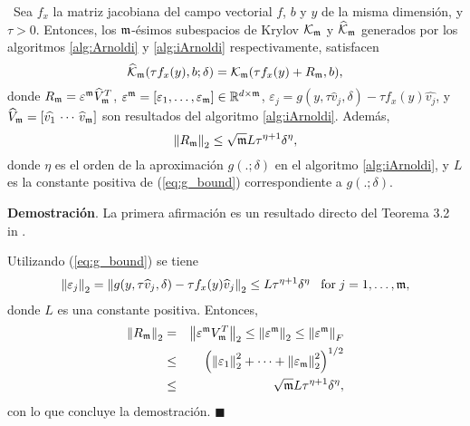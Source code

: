 \begin{theorem} \label{theorem:krilobapproxequality} \cite{naranjo2021locally}~Sea $f_x$ la matriz jacobiana del campo vectorial $f$, $b$ y $y$ de la misma dimensión, y $\tau>0$. Entonces, los $\mathfrak{m}$-ésimos subespacios de Krylov $\mathcal{K}_{\mathfrak{m}}$ y $\widehat{\mathcal{K}}_{\mathfrak{m}}$ generados por los algoritmos \ref{alg:Arnoldi} y \ref{alg:iArnoldi} respectivamente, satisfacen 
	\[ \widehat{\mathcal{K}}_{\mathfrak{m}}(\tau f_x(y),b;\delta) = \mathcal{K}_{\mathfrak{m}}(\tau f_x(y)+R_{\mathfrak{m}},b), \]
	donde $R_{\mathfrak{m}} =  \varepsilon^{\mathfrak{m}}\widehat{V}^T_{\mathfrak{m}}$,  
	$\varepsilon^{\mathfrak{m}} = [\varepsilon_1,\dots,\varepsilon_{\mathfrak{m}}] \in \mathbb{R}^{d\times \mathfrak{m}}$, $\varepsilon_j = g(y,\tau\widehat{v}_j,\delta)- \tau f_x(y)\widehat{v_j}$, y $\widehat{V}_{\mathfrak{m}}=[\widehat{v_1}\,\cdots \,\widehat{v}_{\mathfrak{m}}]$ son resultados del algoritmo \ref{alg:iArnoldi}. Además, 
	\[ \left\lVert R_{\mathfrak{m}} \right\rVert_2\leq \sqrt{\mathfrak{m}}L \tau^{\eta+1}\delta^{\eta}, \]
	donde $\eta$ es el orden de la aproximación $g(.;\delta)$ en el algoritmo \ref{alg:iArnoldi}, y $L$ es la constante positiva de (\ref{eq:g_bound}) correspondiente a $g(.;\delta)$.
\end{theorem}
\textbf{Demostración}. La primera afirmación es un resultado directo del Teorema 3.2 in \cite{brown1987local}.

Utilizando  (\ref{eq:g_bound}) se tiene
\[ \left\lVert \varepsilon_j \right\rVert_2=\left\lVert g(y,\tau\widehat{v}_j,\delta)-\tau f_x(y)\widehat{v}_j \right\rVert_2 \leq  L \tau^{\eta+1}\delta^{\eta}\;\;\;\text{for}\;j=1,\dots,\mathfrak{m}, \]
donde $L$ es una constante positiva. Entonces, 
\begin{eqnarray*}
	\left\lVert R_{\mathfrak{m}} \right\rVert_2 & = & \left\lVert \varepsilon^{\mathfrak{m}} V_{\mathfrak{m}}^T \right\rVert_2\leq\left\lVert \varepsilon^{\mathfrak{m}} \right\rVert_2\leq \left\lVert \varepsilon^{\mathfrak{m}} \right\rVert_F \\
	& \leq & \left( \left\lVert \varepsilon_1 \right\rVert_2^2 + \cdots + \left\lVert \varepsilon_{\mathfrak{m}} \right\rVert_2^2 \right)^{1/2} \\
	& \leq & \sqrt{\mathfrak{m}}L \tau^{\eta+1}\delta^{\eta},
\end{eqnarray*}
con lo que concluye la demostración. $\blacksquare$\\

